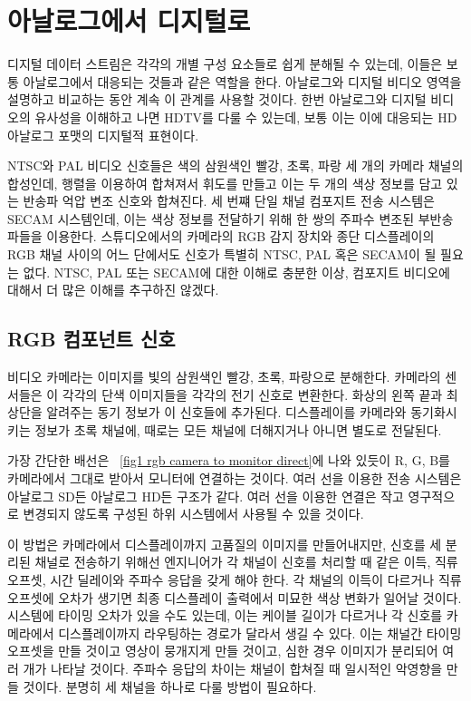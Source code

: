 \chapter{아날로그에서 디지털로}

디지털 데이터 스트림은 각각의 개별 구성 요소들로 쉽게 분해될 수 있는데, 이들은 보통 아날로그에서 대응되는 것들과 같은 역할을 한다.
아날로그와 디지털 비디오 영역을 설명하고 비교하는 동안 계속 이 관계를 사용할 것이다.
한번 아날로그와 디지털 비디오의 유사성을 이해하고 나면 HDTV를 다룰 수 있는데, 보통 이는 이에 대응되는 HD 아날로그 포맷의 디지털적 표현이다.


NTSC와 PAL 비디오 신호들은 색의 삼원색인 빨강, 초록, 파랑 세 개의 카메라 채널의 합성인데, 행렬을 이용하여 합쳐져서 휘도를 만들고 이는 두 개의 색상 정보를 담고 있는 반송파 억압 변조 신호와 합쳐진다.
세 번쨰 단일 채널 컴포지트 전송 시스템은 SECAM 시스템인데, 이는 색상 정보를 전달하기 위해 한 쌍의 주파수 변조된 부반송파들을 이용한다.
스튜디오에서의 카메라의 RGB 감지 장치와 종단 디스플레이의 RGB 채널 사이의 어느 단에서도 신호가 특별히 NTSC, PAL 혹은 SECAM이 될 필요는 없다.
NTSC, PAL 또는 SECAM에 대한 이해로 충분한 이상, 컴포지트 비디오에 대해서 더 많은 이해를 추구하진 않겠다.

\section{RGB 컴포넌트 신호}
비디오 카메라는 이미지를 빛의 삼원색인 빨강, 초록, 파랑으로 분해한다. 카메라의 센서들은 이 각각의 단색 이미지들을 각각의 전기 신호로 변환한다.
화상의 왼쪽 끝과 최상단을 알려주는 동기 정보가 이 신호들에 추가된다. 디스플레이를 카메라와 동기화시키는 정보가 초록 채널에, 때로는 모든 채널에 더해지거나 아니면 별도로 전달된다.


가장 간단한 배선은 \figurename~\ref{fig1 rgb camera to monitor direct}에 나와 있듯이 R, G, B를 카메라에서 그대로 받아서 모니터에 연결하는 것이다. 여러 선을 이용한 전송 시스템은 아날로그 SD든 아날로그 HD든 구조가 같다.
여러 선을 이용한 연결은 작고 영구적으로 변경되지 않도록 구성된 하위 시스템에서 사용될 수 있을 것이다.


이 방법은 카메라에서 디스플레이까지 고품질의 이미지를 만들어내지만, 신호를 세 분리된 채널로 전송하기 위해선 엔지니어가 각 채널이 신호를 처리할 때 같은 이득, 직류 오프셋, 시간 딜레이와 주파수 응답을 갖게 해야 한다.
각 채널의 이득이 다르거나 직류 오프셋에 오차가 생기면 최종 디스플레이 출력에서 미묘한 색상 변화가 일어날 것이다.
시스템에 타이밍 오차가 있을 수도 있는데, 이는 케이블 길이가 다르거나 각 신호를 카메라에서 디스플레이까지 라우팅하는 경로가 달라서 생길 수 있다.
이는 채널간 타이밍 오프셋을 만들 것이고 영상이 뭉개지게 만들 것이고, 심한 경우 이미지가 분리되어 여러 개가 나타날 것이다.
주파수 응답의 차이는 채널이 합쳐질 때 일시적인 악영향을 만들 것이다.
분명히 세 채널을 하나로 다룰 방법이 필요하다.


